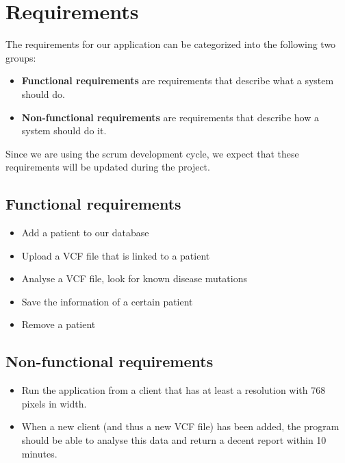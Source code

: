 \section{Requirements}
The requirements for our application can be categorized into the following two groups:
\begin{itemize}
\item \textbf{Functional requirements} are requirements that describe what a system should do.
\item \textbf{Non-functional requirements} are requirements that describe how a system should do it.
\end{itemize}
Since we are using the scrum development cycle, we expect that these requirements will be updated during the project.  

\subsection{Functional requirements}
\begin{itemize}
\item Add a patient to our database 
\item Upload a VCF file that is linked to a patient
\item Analyse a VCF file, look for known disease mutations
\item Save the information of a certain patient
\item Remove a patient

\end{itemize}

\subsection{Non-functional requirements}
\begin{itemize}
\item Run the application from a client that has at least a resolution with 768 pixels in width.
\item When a new client (and thus a new VCF file) has been added, the program should be able to analyse this data and return a decent report within 10 minutes. 
\end{itemize}

